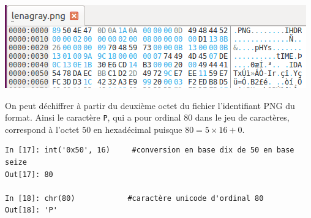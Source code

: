 \documentclass[a4paper, french, 12pt]{article}  %
\newcounter{act}
\begin{document}
\begin{center}
	\includegraphics[scale=0.7]{ressources/fichier-binaire.png}
\end{center}

On peut déchiffrer à partir du deuxième octet du fichier l'identifiant PNG du format. Ainsi le caractère \texttt{P}, qui  a pour ordinal $80$ dans le jeu de caractères, correspond à l'octet $50$ en hexadécimal puisque $80 = 5 \times 16 + 0$.

\begin{lstlisting}
In [17]: int('0x50', 16)     #conversion en base dix de 50 en base seize                                                   
Out[17]: 80

In [18]: chr(80)            #caractère unicode d'ordinal 80                                              
Out[18]: 'P'
\end{lstlisting}
\end{document}

